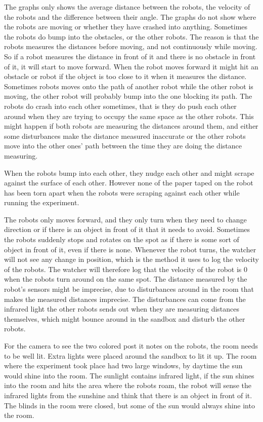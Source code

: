 The graphs only shows the average distance between the robots, the velocity of the robots and the difference between their angle. The graphs do not show where the robots are moving or whether they have crashed into anything.
Sometimes the robots do bump into the obstacles, or the other robots. The reason is that the robots measures the distances before moving, and not continuously while moving. So if a robot measures the distance in front of it and there is no obstacle in front of it, it will start to move forward. When the robot moves forward it might hit an obstacle or robot if the object is too close to it when it measures the distance. Sometimes robots moves onto the path of another robot while the other robot is moving, the other robot will probably bump into the one blocking its path. The robots do  crash into each other sometimes, that is they do push each other around when they are trying to occupy the same space as the other robots. This might happen if both robots are measuring the distances around them, and either some disturbances make the distance measured inaccurate or the other robots move into the other ones' path between the time they are doing the distance measuring.

When the robots bump into each other, they nudge each other and might scrape against the surface of each other. However none of the paper taped on the robot has been torn apart when the robots were scraping against each other while running the experiment.

The robots only moves forward, and they only turn when they need to change direction or if there is an object in front of it that it needs to avoid. Sometimes the robots suddenly stops and rotates on the spot as if there is some sort of object in front of it, even if there is none.
Whenever the robot turns, the watcher will not see any change in position, which is the method it uses to log the velocity of the robots. The watcher will therefore log that the velocity of the robot is 0 when the robots turn around on the same spot. 
The distance measured by the robot's sensors might be imprecise, due to disturbances around in the room that makes the measured distances imprecise. The disturbances can come from the infrared light the other robots sends out when they are measuring distances themselves, which might bounce around in the sandbox and disturb the other robots. 

For the camera to see the two colored post it notes on the robots, the room needs to be well lit. Extra lights were placed around the sandbox to lit it up. The room where the experiment took place had two large windows, by daytime the sun would shine into the room. The sunlight contains infrared light, if the sun shines into the room and hits the area where the robots roam, the robot will sense the infrared lights from the sunshine and think that there is an object in front of it. The blinds in the room were closed, but some of the sun would always shine into the room.
